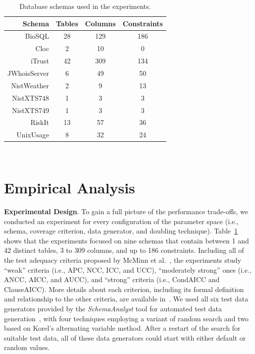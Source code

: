 
\begin{table}[t]
  \centering

  {\footnotesize
  \begin{tabular}{r | c c c}
                           Schema & Tables & Columns & Constraints \\ \hline
    BioSQL                        & 28     & 129     & 186 \\
    Cloc                          & 2      & 10      & 0 \\
    iTrust                        & 42     & 309     & 134 \\
    JWhoisServer                  & 6      & 49      & 50 \\
    NistWeather                   & 2      & 9       & 13 \\
    NistXTS748                    & 1      & 3       & 3 \\
    NistXTS749                    & 1      & 3       & 3 \\
    RiskIt                        & 13     & 57      & 36 \\
    UnixUsage                     & 8      & 32      & 24
\end{tabular}}

  \vspace*{-.05in}
  \caption{Database schemas used in the experiments.}~\label{tab:schemas}
  \vspace*{-.25in}

\end{table}

\vspace{-.05in}
\section{Empirical Analysis}
\vspace{-.05in}

\textbf{Experimental Design}. To gain a full picture of the performance trade-offs, we conducted an experiment for every
configuration of the parameter space (i.e., schema, coverage criterion, data generator, and doubling technique).
Table~\ref{tab:schemas} shows that the experiments focused on nine schemas that contain between 1 and 42 distinct
tables, 3 to 309 columns, and up to 186 constraints. Including all of the test adequacy criteria proposed by McMinn et
al.~\cite{mcminn2015}, the experiments study ``weak'' criteria (i.e., APC, NCC, ICC, and UCC), ``moderately strong''
ones (i.e., ANCC, AICC, and AUCC), and ``strong'' criteria (i.e., CondAICC and ClauseAICC). More details about each
criterion, including its formal definition and relationship to the other criteria, are available in~\cite{mcminn2015}. We
used all six test data generators provided by the {\em SchemaAnalyst} tool for automated test data
generation~\cite{kapfhammer2013}, with four techniques employing a variant of random search and two based on Korel's
alternating variable method. After a restart of the search for suitable test data, all of these data generators could
start with either default or random values.

